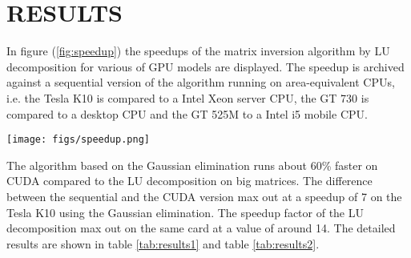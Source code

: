 
\section{RESULTS}\label{sec:results}
In figure (\ref{fig:speedup}) the speedups of the matrix inversion algorithm by LU decomposition for various of GPU models are displayed. The speedup is archived against a sequential version of the algorithm running on area-equivalent CPUs, i.e. the Tesla K10 is compared to a Intel Xeon server CPU, the GT 730 is compared to a desktop CPU and the GT 525M to a Intel i5 mobile CPU. 
\begin{figure*}
	\texttt{[image: figs/speedup.png]}
	\centering
	\label{fig:speedup}
	\caption{Speedup of matrix inversion using LU decomposition compared to area-equivalent CPUs}
\end{figure*}

The algorithm based on the Gaussian elimination runs about 60\% faster on CUDA compared to the LU decomposition on big matrices. The difference between the sequential and the CUDA version max out at a speedup of 7 on the Tesla K10 using the Gaussian elimination. The speedup factor of the LU decomposition max out on the same card at a value of around 14. The detailed results are shown in table \ref{tab:results1} and table \ref{tab:results2}.

